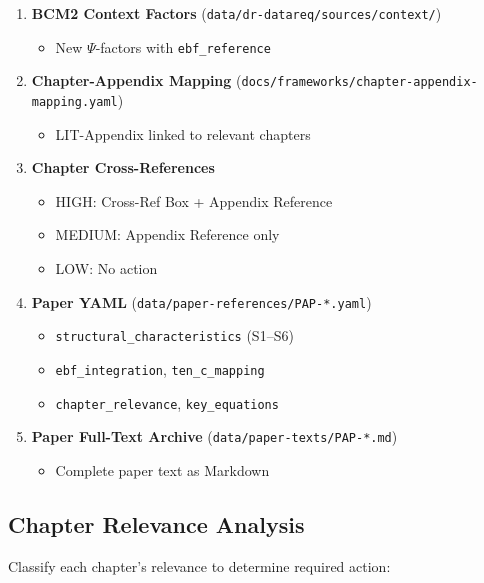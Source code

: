 \begin{enumerate}
    \item \textbf{BCM2 Context Factors} (\texttt{data/dr-datareq/sources/context/})
    \begin{itemize}
        \item New $\Psi$-factors with \texttt{ebf\_reference}
    \end{itemize}

    \item \textbf{Chapter-Appendix Mapping} (\texttt{docs/frameworks/chapter-appendix-mapping.yaml})
    \begin{itemize}
        \item LIT-Appendix linked to relevant chapters
    \end{itemize}

    \item \textbf{Chapter Cross-References}
    \begin{itemize}
        \item HIGH: Cross-Ref Box + Appendix Reference
        \item MEDIUM: Appendix Reference only
        \item LOW: No action
    \end{itemize}

    \item \textbf{Paper YAML} (\texttt{data/paper-references/PAP-*.yaml})
    \begin{itemize}
        \item \texttt{structural\_characteristics} (S1--S6)
        \item \texttt{ebf\_integration}, \texttt{ten\_c\_mapping}
        \item \texttt{chapter\_relevance}, \texttt{key\_equations}
    \end{itemize}

    \item \textbf{Paper Full-Text Archive} (\texttt{data/paper-texts/PAP-*.md})
    \begin{itemize}
        \item Complete paper text as Markdown
    \end{itemize}
\end{enumerate}

\subsection{Chapter Relevance Analysis}
\label{sec:paperint-chapter-relevance}

Classify each chapter's relevance to determine required action:

